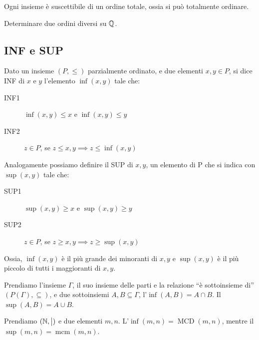 \begin{theorem}
Ogni insieme \`e suscettibile di un ordine totale, ossia si pu\`o totalmente ordinare.
\end{theorem}

\begin{esercizio}
Determinare due ordini diversi su $\mathbb{Q}$.

\vspace{5cm}
\end{esercizio}

\subsection{INF e SUP}

\begin{defn}[INF]
Dato un insieme $(P, \leq)$ parzialmente ordinato, e due elementi $x,y \in P$, si dice INF di $x$ e $y$ l'elemento $\inf(x,y)$ tale che:
\begin{description}
    \item[INF1\label{itm:inf1}] $\inf(x,y) \leq x $ e $ \inf(x,y) \leq y$
    \item[INF2\label{itm:inf2}] $z \in P$, se $ z \leq x, y \implies z \leq \inf(x,y)$
\end{description}
\end{defn}
\begin{defn}[SUP]
Analogamente possiamo definire il SUP di $x,y$, un elemento di P che si indica con $\sup(x,y)$ tale che:
\begin{description}
    \item[SUP1\label{itm:sup1}] $\sup(x,y) \geq x $ e $ \sup(x,y) \geq y$
    \item[SUP2\label{itm:sup2}] $z \in P$, se $ z \geq x, y \implies z \geq \sup(x,y)$
\end{description}
\end{defn}

Ossia, $\inf(x,y)$ \`e il pi\`u grande dei minoranti di $x,y$ e $\sup(x,y)$ \`e il pi\`u piccolo di tutti i maggioranti di $x, y$.

Prendiamo l'insieme $\Gamma$, il suo insieme delle parti e la relazione ``\`e sottoinsieme di'' $(P(\Gamma),\subseteq)$, e due sottoinsiemi $A, B \subseteq \Gamma$, l'$\inf(A,B) = A \cap B$. Il $\sup(A,B) = A \cup B$.

Prendiamo $(\mathbb{N},\bigm|)$ e due elementi $m, n$. L'$\inf(m,n) = \operatorname{MCD}(m,n)$, mentre il $\sup(m,n) = \operatorname{mcm}(m,n)$.

